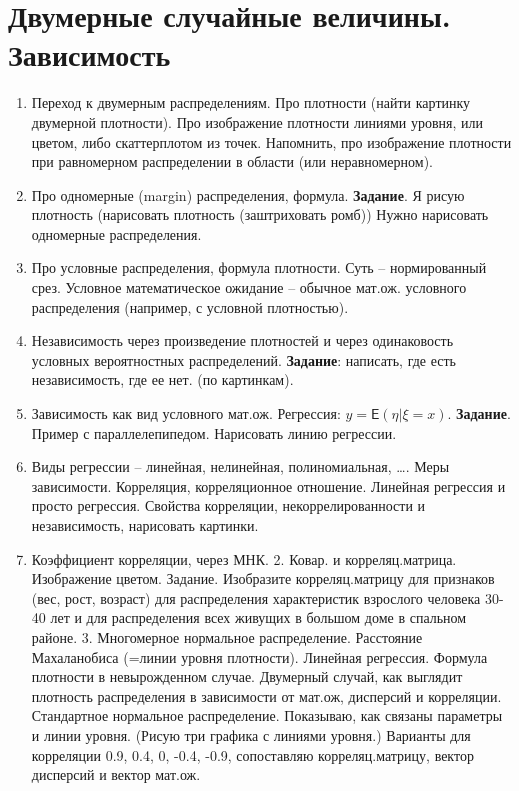 \section{Двумерные случайные величины. Зависимость}

\begin{enumerate}
\item	Переход к двумерным распределениям. Про плотности (найти картинку двумерной плотности). Про изображение плотности линиями уровня, или цветом, либо скаттерплотом из точек. Напомнить, про изображение плотности при равномерном распределении в области (или неравномерном).
\item	Про одномерные (margin) распределения, формула. \textbf{Задание}. Я рисую плотность (нарисовать плотность (заштриховать ромб)) Нужно нарисовать одномерные распределения.
\item	Про условные распределения, формула плотности. Суть – нормированный срез. Условное математическое ожидание – обычное мат.ож. условного распределения (например, с условной плотностью).
\item	Независимость через произведение плотностей и через одинаковость условных вероятностных распределений. \textbf{Задание}: написать, где есть независимость, где ее нет. (по картинкам).
\item	Зависимость как вид условного мат.ож. Регрессия: $y = \textsf{E}(\eta | \xi = x)$. \textbf{Задание}. Пример с параллелепипедом. Нарисовать линию регрессии.
\item	Виды регрессии – линейная, нелинейная, полиномиальная, …. Меры зависимости. Корреляция, корреляционное отношение. Линейная регрессия и просто регрессия. Свойства корреляции, некоррелированности и независимость, нарисовать картинки.
\item	Коэффициент корреляции, через МНК.
2.	Ковар. и корреляц.матрица. Изображение цветом. Задание. Изобразите корреляц.матрицу для признаков (вес, рост, возраст) для распределения характеристик взрослого человека 30-40 лет и для распределения всех живущих в большом доме в спальном районе.
3.	Многомерное нормальное распределение. Расстояние Махаланобиса (=линии уровня плотности). Линейная регрессия. Формула плотности в невырожденном случае. Двумерный случай, как выглядит плотность распределения в зависимости от мат.ож, дисперсий и корреляции. Стандартное нормальное распределение. Показываю, как связаны параметры и линии уровня. (Рисую три графика с линиями уровня.)  Варианты для корреляции 0.9, 0.4, 0, -0.4, -0.9, сопоставляю корреляц.матрицу, вектор дисперсий и вектор мат.ож.



\end{enumerate}
